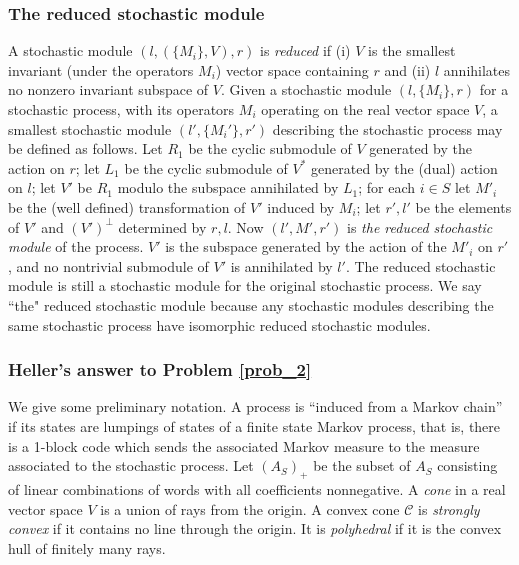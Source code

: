 \documentclass{kepart2010}
\theoremstyle{plain}
\theoremstyle{definition}
\theoremstyle{remark}
\theoremstyle{definition}
\numberwithin{equation}{section}
\begin{document}
\subsubsection{The reduced stochastic
module}\label{subsubsec_redstochmod}
{ A stochastic module
$(l,(\{M_i\},V),r)$ is {\it reduced} if (i) $V$ is the smallest
invariant (under the operators $M_i$) vector space containing $r$
and (ii) $l$ annihilates no nonzero invariant subspace of $V$. }
Given a stochastic module $(l,\{M_i\},r)$ for a stochastic process,
with its operators $M_i$ operating on the real vector space $V$, a
smallest stochastic module $(l',\{M_i'\},r')$ describing the
stochastic process may be defined as follows. Let $R_1$ be the
cyclic submodule of $V$ generated by the action on $r$; let $L_1$ be
the cyclic submodule of $V^*$ generated by the (dual) action on $l$;
let $V'$ be $R_1$ modulo the subspace annihilated by $L_1$; for each
$i \in S$ let $M'_i$ be the (well defined) transformation of $V'$
induced by $M_i$; let $r',l'$ be the elements of $V'$ and
$(V')^\perp$ determined by $r,l$. Now $(l',M',r')$ is {\em the
reduced stochastic module} of the process.
 $V'$ is the subspace generated by the
action of the $M'_i$ on $r'$, and no nontrivial submodule of $V'$ is
annihilated by $l'$. The reduced stochastic module is still a
stochastic module for the original stochastic process.
We say ``the"
reduced stochastic module because any stochastic modules describing
the same stochastic process have isomorphic reduced stochastic
modules.

\subsubsection{Heller's answer to Problem \ref{prob_2}}
\label{subsubsec_hellersanswer}
 We give some preliminary
notation.
 A process is ``induced from a Markov
chain'' if its states are lumpings of states of a finite state
Markov process, that is, there is a 1-block code which sends the
associated Markov measure to the measure associated to the
stochastic process. Let $(A_S)_+$ be the subset of $A_S$ consisting
of linear combinations of words with all coefficients nonnegative. A
{\it cone} in a real vector space $V$ is a union of rays from the
origin. A convex cone $\mathcal C$ is {\it strongly convex} if it
contains no line through the origin. It is {\it polyhedral} if it is
the convex hull of finitely many
rays.
\end{document}
